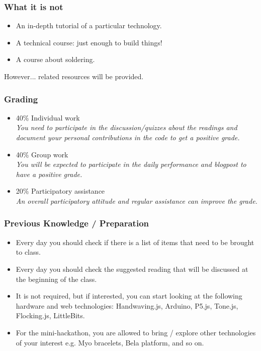 \documentclass[screen, aspectratio=43]{beamer}
\begin{document}
%
\begin{frame}
\frametitle{What it is not}
\begin{itemize}
\item An in-depth tutorial of a particular technology.
\item A technical course: just enough to build things!
\item A course about soldering.
\end{itemize}
However... related resources will be provided.
\end{frame}
%
\begin{frame}
\frametitle{Grading}
\begin{itemize}
\item 40\% Individual work\\
\emph{You need to participate in the discussion/quizzes about the readings and document your personal contributions in the code to get a positive grade.}
\item 40\% Group work\\
\emph{You will be expected to participate in the daily performance and blogpost to have a positive grade.}
\item 20\% Participatory assistance\\
\emph{An overall participatory attitude and regular assistance can improve the grade.}
\end{itemize}
\end{frame}
%
\begin{frame}
\frametitle{Previous Knowledge / Preparation}
\begin{itemize}
\item Every day you should check if there is a list of items that need to be brought to class.
\item Every day you should check the suggested reading that will be discussed at the beginning of the class.
\item It is not required, but if interested, you can start looking at the following hardware and web technologies: Handwaving.js, Arduino, P5.js, Tone.js, Flocking.js, LittleBits. 
\item For the mini-hackathon, you are allowed to bring / explore other technologies of your interest e.g. Myo bracelets, Bela platform, and so on.
\end{itemize}
\end{frame}
%
\end{document}
